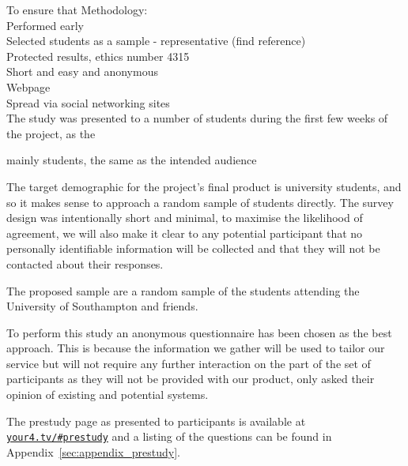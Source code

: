 To ensure that %
Methodology:\\
Performed early\\
Selected students as a sample - representative (find reference)\\
Protected results, ethics number 4315\\


Short and easy and anonymous\\
Webpage\\
Spread via social networking sites\\



The study was presented to a number of students during the first few weeks of the project, as the 

mainly students, the same as the intended audience


The target demographic for the project's final product is university students, and so it makes sense to approach a random sample of students directly. The survey design was intentionally short and minimal, to maximise the likelihood of agreement, we will also make it clear to any potential participant that no personally identifiable information will be collected and that they will not be contacted about their responses. %

The proposed sample are a random sample of the students attending the University of Southampton and friends.


To perform this study an anonymous questionnaire has been chosen as the best approach. This is because the information we gather will be used to tailor our service but will not require any further interaction on the part of the set of participants as they will not be provided with our product, only asked their opinion of existing and potential systems.









The prestudy page as presented to participants is available at \href{http://your4.tv/\#prestudy}{\texttt{your4.tv/\#prestudy}} and a listing of the questions can be found in Appendix~\ref{sec:appendix_prestudy}. %


